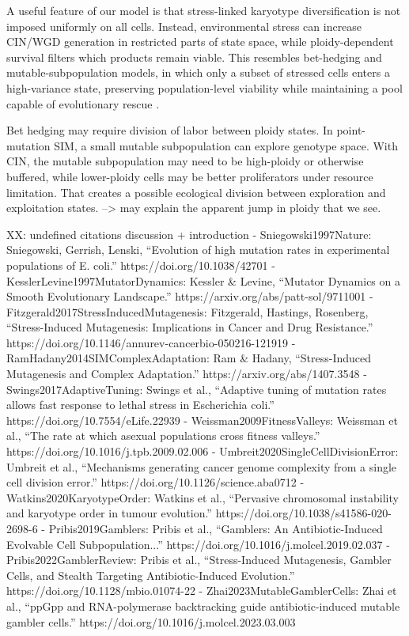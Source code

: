\documentclass[11pt]{article}
\begin{document}
  A useful feature of our model is that stress-linked karyotype diversification is not imposed uniformly on all cells. Instead, environmental stress can increase CIN/WGD generation in restricted parts of state
  space, while ploidy-dependent survival filters which products remain viable. This resembles bet-hedging and mutable-subpopulation models, in which only a subset of stressed cells enters a high-variance state,
  preserving population-level viability while maintaining a pool capable of evolutionary rescue \cite{Pribis2019Gamblers,Pribis2022GamblerReview,Zhai2023MutableGamblerCells}.

Bet hedging may require division of labor between ploidy states.
     In point-mutation SIM, a small mutable subpopulation can explore genotype space. With CIN, the mutable subpopulation may need to be high-ploidy or otherwise buffered, while lower-ploidy cells may be better proliferators under resource limitation. That creates a possible ecological division between exploration and exploitation states. --> may explain the apparent jump in ploidy that we see.

XX: undefined citations discussion + introduction
- Sniegowski1997Nature: Sniegowski, Gerrish, Lenski, “Evolution of high mutation rates in experimental populations of E. coli.” https://doi.org/10.1038/42701
  - KesslerLevine1997MutatorDynamics: Kessler & Levine, “Mutator Dynamics on a Smooth Evolutionary Landscape.” https://arxiv.org/abs/patt-sol/9711001
  - Fitzgerald2017StressInducedMutagenesis: Fitzgerald, Hastings, Rosenberg, “Stress-Induced Mutagenesis: Implications in Cancer and Drug Resistance.” https://doi.org/10.1146/annurev-cancerbio-050216-121919
  - RamHadany2014SIMComplexAdaptation: Ram & Hadany, “Stress-Induced Mutagenesis and Complex Adaptation.” https://arxiv.org/abs/1407.3548
  - Swings2017AdaptiveTuning: Swings et al., “Adaptive tuning of mutation rates allows fast response to lethal stress in Escherichia coli.” https://doi.org/10.7554/eLife.22939
  - Weissman2009FitnessValleys: Weissman et al., “The rate at which asexual populations cross fitness valleys.” https://doi.org/10.1016/j.tpb.2009.02.006
  - Umbreit2020SingleCellDivisionError: Umbreit et al., “Mechanisms generating cancer genome complexity from a single cell division error.” https://doi.org/10.1126/science.aba0712
  - Watkins2020KaryotypeOrder: Watkins et al., “Pervasive chromosomal instability and karyotype order in tumour evolution.” https://doi.org/10.1038/s41586-020-2698-6
  - Pribis2019Gamblers: Pribis et al., “Gamblers: An Antibiotic-Induced Evolvable Cell Subpopulation...” https://doi.org/10.1016/j.molcel.2019.02.037
  - Pribis2022GamblerReview: Pribis et al., “Stress-Induced Mutagenesis, Gambler Cells, and Stealth Targeting Antibiotic-Induced Evolution.” https://doi.org/10.1128/mbio.01074-22
  - Zhai2023MutableGamblerCells: Zhai et al., “ppGpp and RNA-polymerase backtracking guide antibiotic-induced mutable gambler cells.” https://doi.org/10.1016/j.molcel.2023.03.003
\end{document}
